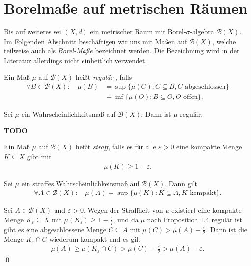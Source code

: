 \section{Borelmaße auf metrischen Räumen}

Bis auf weiteres sei $(X,d)$ ein metrischer Raum mit Borel-$\sigma$-algebra $\mathcal{B}(X)$. 
Im Folgenden Abschnitt beschäftigen wir uns mit Maßen auf $\mathcal{B}(X)$, welche teilweise auch als \textit{Borel-Maße} bezeichnet werden. 
Die Bezeichnung wird in der Literatur allerdings nicht einheitlich verwendet. 

\begin{mydef}
    Ein Maß $\mu$ auf $\mathcal{B}(X)$ heißt \textit{regulär} , falls
    \begin{align*}
        \forall B \in \mathcal{B}(X): \quad \mu(B) &= \sup\{\mu(C): C \subseteq B, C \text{ abgeschlossen} \} \\\
                                                   &= \inf\{\mu(O): B \subseteq O, O \text{ offen} \}.  
    \end{align*}  
\end{mydef}

\begin{proposition}
    Sei $\mu$ ein Wahrscheinlichkeitsmaß auf $\mathcal{B}(X)$. Dann ist $\mu$ regulär. 
\end{proposition}

\begin{proof*}
    \textbf{TODO}
\end{proof*}

\begin{mydef}
    Ein Maß $\mu$ auf $\mathcal{B}(X)$ heißt \textit{straff}, falls es für alle $\varepsilon > 0$ eine kompakte Menge $K \subseteq X$ gibt mit 
    \begin{align*}
        \mu(K) \geq 1 - \varepsilon. 
    \end{align*}

\end{mydef}

\begin{corollary}
    Sei $\mu$ ein straffes Wahrscheinlichkeitsmaß auf $\mathcal{B}(X)$. Dann gilt
    \begin{align*}
        \forall A \in \mathcal{B}(X): \quad \mu(A) = \sup\{\mu(K): K \subseteq A, K \text{ kompakt}\}. 
    \end{align*}
\end{corollary}

\begin{proof*}
    Sei $A \in \mathcal{B}(X)$ und $\varepsilon > 0$. Wegen der Straffheit von $\mu$ existiert eine kompakte Menge $K_{\varepsilon} \subseteq X$ mit $\mu(K_{\varepsilon}) \geq 1 - \frac{\varepsilon}{2}$,
    und da $\mu$ nach Proposition 1.4 regulär ist gibt es eine abgeschlossene Menge $C \subseteq A$ mit $\mu(C) > \mu(A) - \frac{\varepsilon}{2}$. Dann ist die Menge $K_{\varepsilon} \cap C$ wiederum kompakt und es gilt
    \begin{align*}
        \mu(A) \geq \mu(K_{\varepsilon} \cap C) > \mu(C) - \frac{\varepsilon}{2} > \mu(A) - \varepsilon. 
    \end{align*} 
    \qed
\end{proof*}

